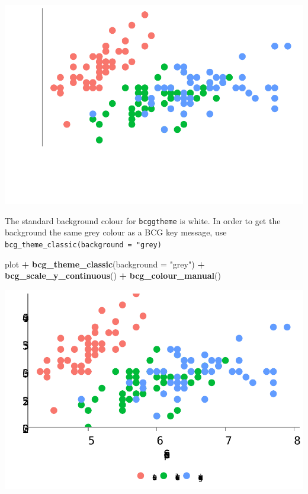 \documentclass[
]{article}
\newenvironment{Shaded}{\begin{snugshade}}{\end{snugshade}}
\newcommand{\DataTypeTok}[1]{\textcolor[rgb]{0.13,0.29,0.53}{#1}}
\newcommand{\KeywordTok}[1]{\textcolor[rgb]{0.13,0.29,0.53}{\textbf{#1}}}
\newcommand{\NormalTok}[1]{#1}
\newcommand{\OperatorTok}[1]{\textcolor[rgb]{0.81,0.36,0.00}{\textbf{#1}}}
\newcommand{\StringTok}[1]{\textcolor[rgb]{0.31,0.60,0.02}{#1}}
\begin{document}
\includegraphics{using_bcggtheme_files/figure-latex/unnamed-chunk-3-1.pdf}

The standard background colour for \texttt{bcggtheme} is white. In order
to get the background the same grey colour as a BCG key message, use
\texttt{bcg\_theme\_classic(background\ =\ "grey)}

\begin{Shaded}
\begin{Highlighting}[]
\NormalTok{plot }\OperatorTok{+}
\StringTok{  }\KeywordTok{bcg_theme_classic}\NormalTok{(}\DataTypeTok{background =} \StringTok{"grey"}\NormalTok{) }\OperatorTok{+}
\StringTok{  }\KeywordTok{bcg_scale_y_continuous}\NormalTok{() }\OperatorTok{+}
\StringTok{  }\KeywordTok{bcg_colour_manual}\NormalTok{()}
\end{Highlighting}
\end{Shaded}

\includegraphics{using_bcggtheme_files/figure-latex/unnamed-chunk-4-1.pdf}
\end{document}

